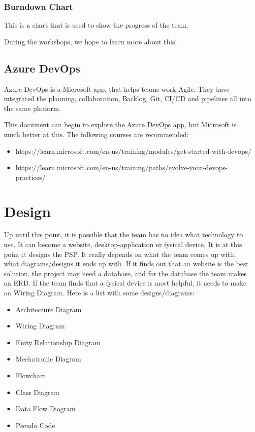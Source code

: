 \documentclass[10pt]{report}
\begin{document}
\subsection{Burndown Chart}

This is a chart that is used to show the progress of the team.

During the workshops, we hope to learn more about this!

\newpage

\section{Azure DevOps}

Azure DevOps is a Microsoft app, that helps teams work Agile. They have integrated the planning, collaboration, Backlog, Git, CI/CD and pipelines all into the same platform. 

This document can begin to explore the Azure DevOps app, but Microsoft is much better at this. The following courses are recommended:

\begin{itemize}
	\item https://learn.microsoft.com/en-us/training/modules/get-started-with-devops/
	\item https://learn.microsoft.com/en-us/training/paths/evolve-your-devops-practices/
\end{itemize}

\newpage

\chapter{Design}
\thispagestyle{fancy}

Up until this point, it is possible that the team has no idea what technology to use. It can become a website, desktop-application or fysical device. It is at this point it designs the PSP. It really depends on what the team comes up with, what diagrams/designs it ends up with. If it finds out that an website is the best solution, the project may need a database, and for the database the team makes an ERD. If the team finds that a fysical device is most helpful, it needs to make an Wiring Diagram. Here is a list with some designs/diagrams:

\begin{itemize}
	\item Architecture Diagram
	\item Wiring Diagram
	\item Enity Relationship Diagram
	\item Mechatronic Diagram
	\item Flowchart
	\item Class Diagram
	\item Data Flow Diagram
	\item Pseudo Code
\end{itemize}
\end{document}
